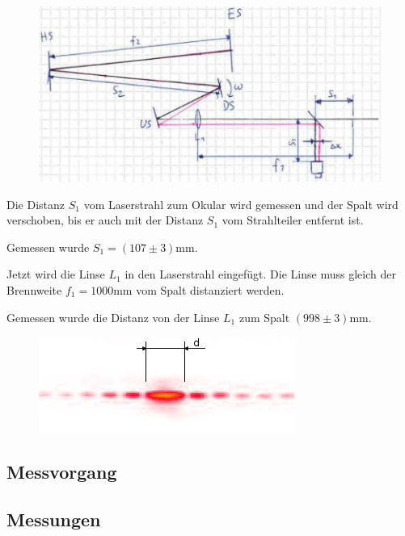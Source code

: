 \begin{figure}[H]
    \center
    \includegraphics[width=\textwidth]{images/setup.pdf}
    \caption{}
    \label{fig:setup}
\end{figure}

Die Distanz $S_1$ vom Laserstrahl zum Okular wird gemessen und der Spalt wird
verschoben, bis er auch mit der Distanz $S_1$ vom Strahlteiler entfernt ist.

Gemessen wurde $S_1 = (107\pm3)\textrm{mm}$.

Jetzt  wird die  Linse $L_1$  in den  Laserstrahl eingef\"ugt. Die  Linse muss
gleich der Brennweite $f_1 = 1000\textrm{mm}$ vom Spalt distanziert werden.

Gemessen wurde die Distanz von der Linse $L_1$ zum Spalt $(998\pm3)\textrm{mm}$.

\begin{figure}[H]
    \center
    \includegraphics[width=.9\textwidth]{images/diffraction.png}
    \caption{}
    \label{fig:diffraction}
\end{figure}


\subsection{Messvorgang}

\subsection{Messungen}


